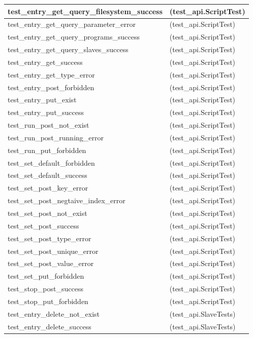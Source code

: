 \begin{longtable}{|p{10cm}|p{7cm}|}
test\_entry\_get\_query\_filesystem\_success & (test\_api.ScriptTest)\\\hline
test\_entry\_get\_query\_parameter\_error & (test\_api.ScriptTest)\\\hline
test\_entry\_get\_query\_programs\_success & (test\_api.ScriptTest)\\\hline
test\_entry\_get\_query\_slaves\_success & (test\_api.ScriptTest)\\\hline
test\_entry\_get\_success & (test\_api.ScriptTest)\\\hline
test\_entry\_get\_type\_error & (test\_api.ScriptTest)\\\hline
test\_entry\_post\_forbidden & (test\_api.ScriptTest)\\\hline
test\_entry\_put\_exist & (test\_api.ScriptTest)\\\hline
test\_entry\_put\_success & (test\_api.ScriptTest)\\\hline
test\_run\_post\_not\_exist & (test\_api.ScriptTest)\\\hline
test\_run\_post\_running\_error & (test\_api.ScriptTest)\\\hline
test\_run\_put\_forbidden & (test\_api.ScriptTest)\\\hline
test\_set\_default\_forbidden & (test\_api.ScriptTest)\\\hline
test\_set\_default\_success & (test\_api.ScriptTest)\\\hline
test\_set\_post\_key\_error & (test\_api.ScriptTest)\\\hline
test\_set\_post\_negtaive\_index\_error & (test\_api.ScriptTest)\\\hline
test\_set\_post\_not\_exist & (test\_api.ScriptTest)\\\hline
test\_set\_post\_success & (test\_api.ScriptTest)\\\hline
test\_set\_post\_type\_error & (test\_api.ScriptTest)\\\hline
test\_set\_post\_unique\_error & (test\_api.ScriptTest)\\\hline
test\_set\_post\_value\_error & (test\_api.ScriptTest)\\\hline
test\_set\_put\_forbidden & (test\_api.ScriptTest)\\\hline
test\_stop\_post\_success & (test\_api.ScriptTest)\\\hline
test\_stop\_put\_forbidden & (test\_api.ScriptTest)\\\hline
test\_entry\_delete\_not\_exist & (test\_api.SlaveTests)\\\hline
test\_entry\_delete\_success & (test\_api.SlaveTests)\\\hline

\end{longtable}
